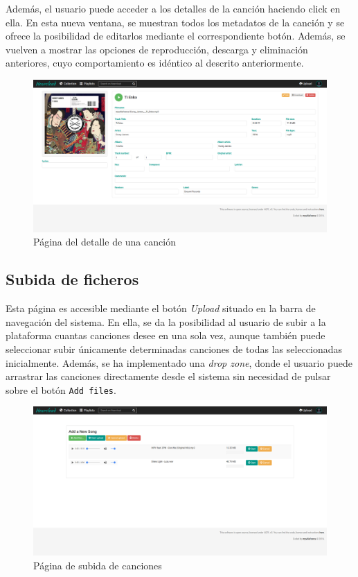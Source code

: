 Además, el usuario puede acceder a los detalles de la canción haciendo click en ella. En esta nueva ventana, se muestran todos los metadatos de la canción y se ofrece la posibilidad de editarlos mediante el correspondiente botón. Además, se vuelven a mostrar las opciones de reproducción, descarga y eliminación anteriores, cuyo comportamiento es idéntico al descrito anteriormente.

\begin{figure}[H] 
\centering 
\includegraphics[scale=0.2]{../images/um/um_5.png}
\caption{Página del detalle de una canción}
\end{figure}

\subsection{Subida de ficheros}

Esta página es accesible mediante el botón \textit{Upload} situado en la barra de navegación del sistema. En ella, se da la posibilidad al usuario de subir a la plataforma cuantas canciones desee en una sola vez, aunque también puede seleccionar subir únicamente determinadas canciones de todas las seleccionadas inicialmente. Además, se ha implementado una \textit{drop zone}, donde el usuario puede arrastrar las canciones directamente desde el sistema sin necesidad de pulsar sobre el botón \texttt{Add files}.

\begin{figure}[H] 
\centering 
\includegraphics[scale=0.2]{../images/um/um_6.png}
\caption{Página de subida de canciones}
\end{figure}

